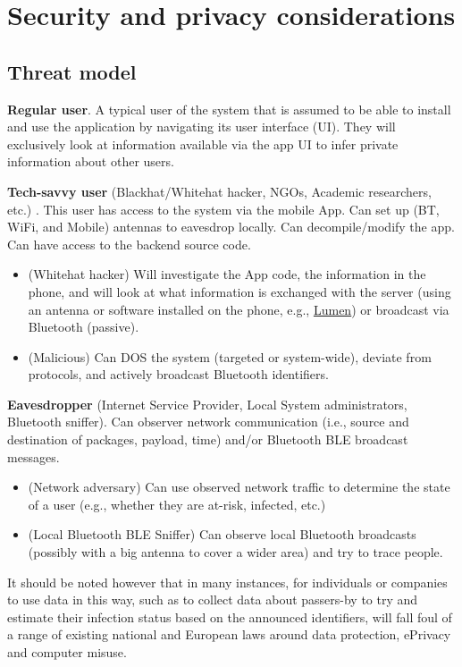 \documentclass[12pt,a4paper]{article}
\begin{document}
\section*{Security and privacy considerations}
\subsection*{Threat model}
\textbf{Regular user}. A typical user of the system that is assumed to be able to install and use the application by navigating its user interface (UI). They will exclusively look at information available via the app UI to infer private information about other users.

\textbf{Tech-savvy user} (Blackhat/Whitehat hacker, NGOs, Academic researchers, etc.) .
This user has access to the system via the mobile App. Can set up (BT, WiFi, and Mobile)
antennas to eavesdrop locally. Can decompile/modify the app. Can have access to the
backend source code.
\begin{itemize}\itemsep0pt
\item (Whitehat hacker) Will investigate the App code, the information in the phone, and will look at what information is exchanged with the server (using an antenna or software
installed on the phone, e.g., \href{http://www.haystack.mobi}{\underline{Lumen}}) or broadcast via Bluetooth (passive).
\item (Malicious) Can DOS the system (targeted or system-wide), deviate from protocols, and actively broadcast Bluetooth identifiers.
\end{itemize}
\textbf{Eavesdropper} (Internet Service Provider, Local System administrators, Bluetooth sniffer). Can observer network communication (i.e., source and destination of packages, payload, time) and/or Bluetooth BLE broadcast messages.
\begin{itemize}
\item  (Network adversary) Can use observed network traffic to determine the state of a
user (e.g., whether they are at-risk, infected, etc.)
\item (Local Bluetooth BLE Sniffer) Can observe local Bluetooth broadcasts (possibly with
a big antenna to cover a wider area) and try to trace people.
\end{itemize}
It should be noted however that in many instances, for individuals or companies to use data in this way, such as to collect data about passers-by to try and estimate their infection status based on the announced identifiers, will fall foul of a range of existing national and European laws around data protection, ePrivacy and computer misuse.
\end{document}
